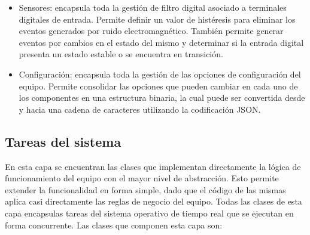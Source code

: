 \begin{itemize}
	\item Sensores: encapsula toda la gestión de filtro digital asociado a terminales digitales de entrada. Permite definir un valor de histéresis para eliminar los eventos generados por ruido electromagnético. También permite generar eventos por cambios en el estado del mismo y determinar si la entrada digital presenta un estado estable o se encuentra en transición.

	\item Configuración: encapsula toda la gestión de las opciones de configuración del equipo. Permite consolidar las opciones que pueden cambiar en cada uno de los componentes en una estructura binaria, la cual puede ser convertida desde y hacia una cadena de caracteres utilizando la codificación JSON.
\end{itemize}


\subsection{Tareas del sistema}

En esta capa se encuentran las clases que implementan directamente la lógica de funcionamiento del equipo con el  mayor nivel de abstracción. Esto permite extender la funcionalidad en forma simple, dado que el código de las mismas aplica casi directamente las reglas de negocio del equipo. Todas las clases de esta capa encapsulas tareas del sistema operativo de tiempo real que se ejecutan en forma concurrente. Las clases que componen esta capa son:

